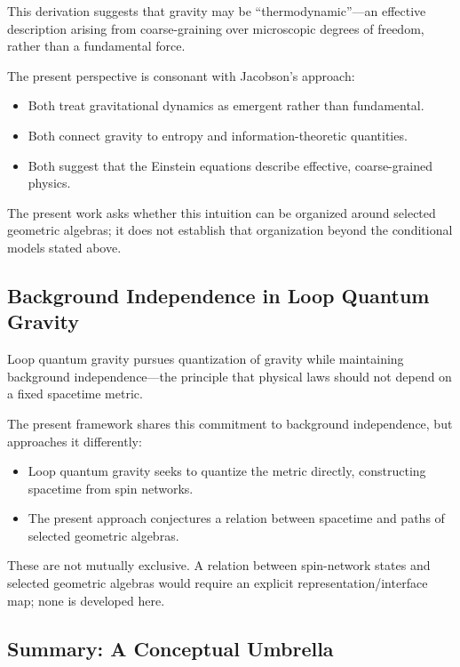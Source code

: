 \documentclass[12pt,a4paper]{article}
\begin{document}
This derivation suggests that gravity may be ``thermodynamic''—an effective description arising from coarse-graining over microscopic degrees of freedom, rather than a fundamental force.

The present perspective is consonant with Jacobson's approach:
\begin{itemize}
    \item Both treat gravitational dynamics as emergent rather than fundamental.
    \item Both connect gravity to entropy and information-theoretic quantities.
    \item Both suggest that the Einstein equations describe effective, coarse-grained physics.
\end{itemize}

The present work asks whether this intuition can be organized around selected geometric algebras; it does not establish that organization beyond the conditional models stated above.

\subsection{Background Independence in Loop Quantum Gravity}

Loop quantum gravity \cite{Rovelli2004,Thiemann2007} pursues quantization of gravity while maintaining background independence—the principle that physical laws should not depend on a fixed spacetime metric.

The present framework shares this commitment to background independence, but approaches it differently:
\begin{itemize}
    \item Loop quantum gravity seeks to quantize the metric directly, constructing spacetime from spin networks.
    \item The present approach conjectures a relation between spacetime and paths of selected geometric algebras.
\end{itemize}

These are not mutually exclusive.  A relation between spin-network states and selected geometric algebras would require an explicit representation/interface map; none is developed here.

\subsection{Summary: A Conceptual Umbrella}
\end{document}
